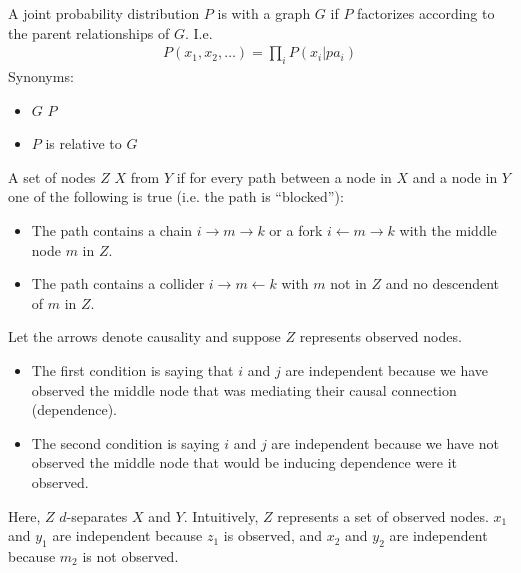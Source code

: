 \begin{definition}
  A joint probability distribution $P$ is  with a graph $G$ if $P$ factorizes according to the
  parent relationships of $G$. I.e.
\begin{align*}
  P(x_1, x_2, \ldots) = \prod_i P(x_i|pa_i)
\end{align*}
 Synonyms:
 \begin{itemize}
 \item $G$  $P$
 \item $P$ is  relative to $G$
 \end{itemize}
\end{definition}

\begin{definition}
  A set of nodes $Z$  $X$ from $Y$ if for every path between a node in $X$ and a node in $Y$ one
  of the following is true (i.e. the path is ``blocked​''):
  \begin{itemize}
  \item The path contains a chain $i \rightarrow m \rightarrow k$ or a fork $i \leftarrow m \rightarrow k$ with the middle node $m$ in $Z$.
  \item The path contains a collider $i \rightarrow m \leftarrow k$ with $m$ not in $Z$ and no descendent of $m$ in $Z$.
  \end{itemize}
\end{definition}

\begin{intuition}
  Let the arrows denote causality and suppose $Z$ represents observed nodes.
  \begin{itemize}
  \item The first condition is saying that $i$ and $j$ are independent because we have observed the middle node
    that was mediating their causal connection (dependence).
  \item The second condition is saying $i$ and $j$ are independent because we have not observed the middle node
    that would be inducing dependence were it observed.
  \end{itemize}
\end{intuition}




Here, $Z$ $d$-separates $X$ and $Y$. Intuitively, $Z$ represents a set of observed nodes. $x_1$ and $y_1$
are independent because $z_1$ is observed, and $x_2$ and $y_2$ are independent because $m_2$ is not observed.

